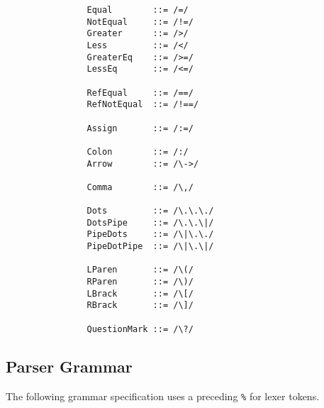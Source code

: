 \documentclass{article}
\begin{document}
\begin{verbatim}
				Equal        ::= /=/
				NotEqual     ::= /!=/
				Greater      ::= />/
				Less         ::= /</
				GreaterEq    ::= />=/
				LessEq       ::= /<=/
				
				RefEqual     ::= /==/
				RefNotEqual  ::= /!==/
				
				Assign       ::= /:=/
				
				Colon        ::= /:/
				Arrow        ::= /\->/
				
				Comma        ::= /\,/
				
				Dots         ::= /\.\.\./
				DotsPipe     ::= /\.\.\|/
				PipeDots     ::= /\|\.\./
				PipeDotPipe  ::= /\|\.\|/
				
				LParen       ::= /\(/
				RParen       ::= /\)/
				LBrack       ::= /\[/
				RBrack       ::= /\]/
				
				QuestionMark ::= /\?/
			\end{verbatim}
			
		\subsection{Parser Grammar}
		
			The following grammar specification uses a preceding \texttt{\%} for lexer tokens.
		
\end{document}
